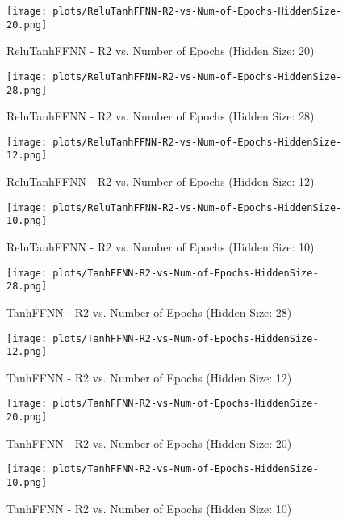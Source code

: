 \begin{figure}[H]
    \centering
    \texttt{[image: plots/ReluTanhFFNN-R2-vs-Num-of-Epochs-HiddenSize-20.png]}
    \caption{ReluTanhFFNN - R2 vs. Number of Epochs (Hidden Size: 20)}
\end{figure}

\begin{figure}[H]
    \centering
    \texttt{[image: plots/ReluTanhFFNN-R2-vs-Num-of-Epochs-HiddenSize-28.png]}
    \caption{ReluTanhFFNN - R2 vs. Number of Epochs (Hidden Size: 28)}
\end{figure}

\begin{figure}[H]
    \centering
    \texttt{[image: plots/ReluTanhFFNN-R2-vs-Num-of-Epochs-HiddenSize-12.png]}
    \caption{ReluTanhFFNN - R2 vs. Number of Epochs (Hidden Size: 12)}
\end{figure}

\begin{figure}[H]
    \centering
    \texttt{[image: plots/ReluTanhFFNN-R2-vs-Num-of-Epochs-HiddenSize-10.png]}
    \caption{ReluTanhFFNN - R2 vs. Number of Epochs (Hidden Size: 10)}
\end{figure}

\begin{figure}[H]
    \centering
    \texttt{[image: plots/TanhFFNN-R2-vs-Num-of-Epochs-HiddenSize-28.png]}
    \caption{TanhFFNN - R2 vs. Number of Epochs (Hidden Size: 28)}
\end{figure}

\begin{figure}[H]
    \centering
    \texttt{[image: plots/TanhFFNN-R2-vs-Num-of-Epochs-HiddenSize-12.png]}
    \caption{TanhFFNN - R2 vs. Number of Epochs (Hidden Size: 12)}
\end{figure}

\begin{figure}[H]
    \centering
    \texttt{[image: plots/TanhFFNN-R2-vs-Num-of-Epochs-HiddenSize-20.png]}
    \caption{TanhFFNN - R2 vs. Number of Epochs (Hidden Size: 20)}
\end{figure}

\begin{figure}[H]
    \centering
    \texttt{[image: plots/TanhFFNN-R2-vs-Num-of-Epochs-HiddenSize-10.png]}
    \caption{TanhFFNN - R2 vs. Number of Epochs (Hidden Size: 10)}
\end{figure}

